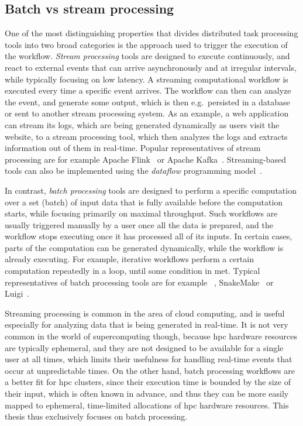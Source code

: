 \subsection*{Batch vs stream processing}
One of the most distinguishing properties that divides distributed task processing tools into two
broad categories is the approach used to trigger the execution of the workflow.
\emph{Stream processing} tools are designed to execute continuously, and react to external events
that can arrive asynchronously and at irregular intervals, while typically focusing on low latency.
A streaming computational workflow is executed every time a specific event arrives. The workflow
can then can analyze the event, and generate some output, which is then e.g.\ persisted in a
database or sent to another stream processing system. As an example, a web application can stream
its logs, which are being generated dynamically as users visit the website, to a stream processing
tool, which then analyzes the logs and extracts information out of them in real-time. Popular
representatives of stream processing are for example Apache Flink~\cite{flink} or Apache
Kafka~\cite{kafka}. Streaming-based tools can also be implemented using the
\emph{dataflow} programming model~\cite{dataflow,timely_dataflow}.

In contrast, \emph{batch processing} tools are designed to perform a specific computation over a
set (batch) of input data that is fully available before the computation starts, while focusing
primarily on maximal throughput. Such workflows are usually triggered manually by a user once all
the data is prepared, and the workflow stops executing once it has processed all of its inputs. In
certain cases, parts of the computation can be generated dynamically, while the workflow is already
executing. For example, iterative workflows perform a certain computation repeatedly in a loop,
until some condition in met. Typical representatives of batch processing tools are for example
\dask{}~\cite{dask}, SnakeMake~\cite{snakemake} or
Luigi~\cite{sciluigi}.

Streaming processing is common in the area of cloud computing, and is useful especially for
analyzing data that is being generated in real-time. It is not very common in the world of
supercomputing though, because \gls{hpc} hardware resources are typically ephemeral,
and they are not designed to be available for a single user at all times, which limits their
usefulness for handling real-time events that occur at unpredictable times. On the other hand,
batch processing workflows are a better fit for \gls{hpc} clusters, since their
execution time is bounded by the size of their input, which is often known in advance, and thus
they can be more easily mapped to ephemeral, time-limited allocations of \gls{hpc}
hardware resources. This thesis thus exclusively focuses on batch processing.


